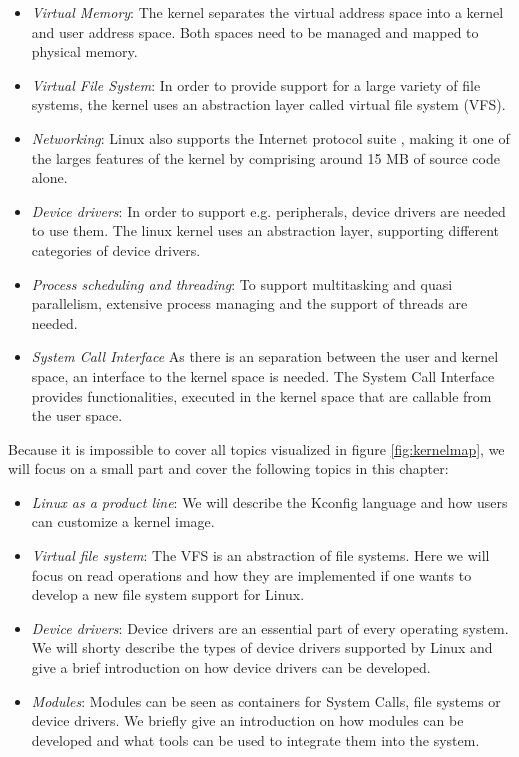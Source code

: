 \documentclass{sig-alternate-05-2015}
\begin{document}
\begin{itemize}
\item \emph{Virtual Memory}: The kernel separates the virtual address space into a kernel and user address space. Both spaces need to be managed and mapped to physical memory.
\item \emph{Virtual File System}: In order to provide support for a large variety of file systems, the kernel uses an abstraction layer called virtual file system (VFS).
\item \emph{Networking}: Linux also supports the  Internet protocol suite \cite{almquist1992type}, making it one of the larges features of the kernel by comprising around 15 MB of source code alone.
\item \emph{Device drivers}: In order to  support e.g. peripherals, device drivers are needed to use them. The linux kernel uses an abstraction layer, supporting different categories of device drivers.
\item \emph{Process scheduling and threading}: To support multitasking and quasi parallelism, extensive process managing and the support of threads are needed.
\item \emph{System Call Interface} As there is an separation between the user and kernel space, an interface to the kernel space is needed. The System Call Interface provides functionalities, executed in the kernel space that are callable from the user space.
\end{itemize}


Because it is impossible to cover all topics visualized in figure \ref{fig:kernelmap}, we will focus on a small part and cover the following topics in this chapter:
\begin{itemize}
\item \emph{Linux as a product line}: We will describe the Kconfig language and how users can customize a kernel image.
\item \emph{Virtual file system}: The VFS is an abstraction of file systems. Here we will focus on read operations and how they are implemented if one wants to develop a new file system support for Linux.
\item \emph{Device drivers}: Device drivers are an essential part of every operating system. We will shorty describe the types of device drivers supported by Linux and give a brief introduction on how device drivers can be developed.
\item \emph{Modules}: Modules can be seen as containers for System Calls, file systems or device drivers. We briefly give an introduction on how modules can be developed and what tools can be used to integrate them into the system.
\end{itemize}
\end{document}
